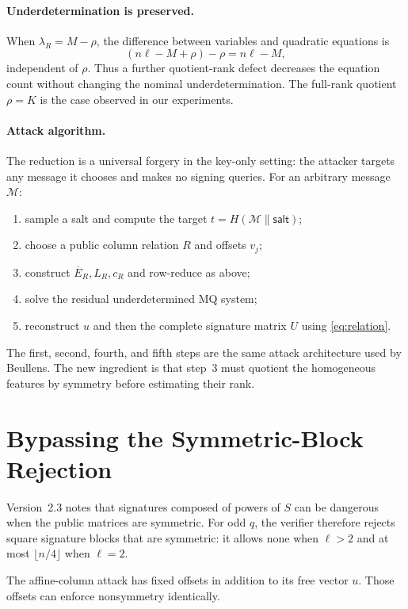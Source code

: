 \documentclass[runningheads]{llncs}
\begin{document}
\paragraph{Underdetermination is preserved.}
When $\lambda_R=M-\rho$, the difference between variables and quadratic equations is
\[
 (n\ell-M+\rho)-\rho=n\ell-M,
\]
independent of $\rho$.  Thus a further quotient-rank defect decreases the equation count without changing the nominal underdetermination.  The full-rank quotient $\rho=K$ is the case observed in our experiments.

\paragraph{Attack algorithm.}
The reduction is a universal forgery in the key-only setting: the attacker targets any message it chooses and makes no signing queries.  For an arbitrary message $\mathcal M$:
\begin{enumerate}
\item sample a salt and compute the target $t=H(\mathcal M\|\textsf{salt})$;
\item choose a public column relation $R$ and offsets $v_j$;
\item construct $\overline E_R,L_R,c_R$ and row-reduce as above;
\item solve the residual underdetermined MQ system;
\item reconstruct $u$ and then the complete signature matrix $U$ using \cref{eq:relation}.
\end{enumerate}
The first, second, fourth, and fifth steps are the same attack architecture used by Beullens.  The new ingredient is that step~3 must quotient the homogeneous features by symmetry before estimating their rank.

\section{Bypassing the Symmetric-Block Rejection}\label{sec:rejection}

Version~2.3 notes that signatures composed of powers of $S$ can be dangerous when the public matrices are symmetric.  For odd $q$, the verifier therefore rejects square signature blocks that are symmetric: it allows none when $\ell>2$ and at most $\lfloor n/4\rfloor$ when $\ell=2$.

The affine-column attack has fixed offsets in addition to its free vector $u$.  Those offsets can enforce nonsymmetry identically.
\end{document}
